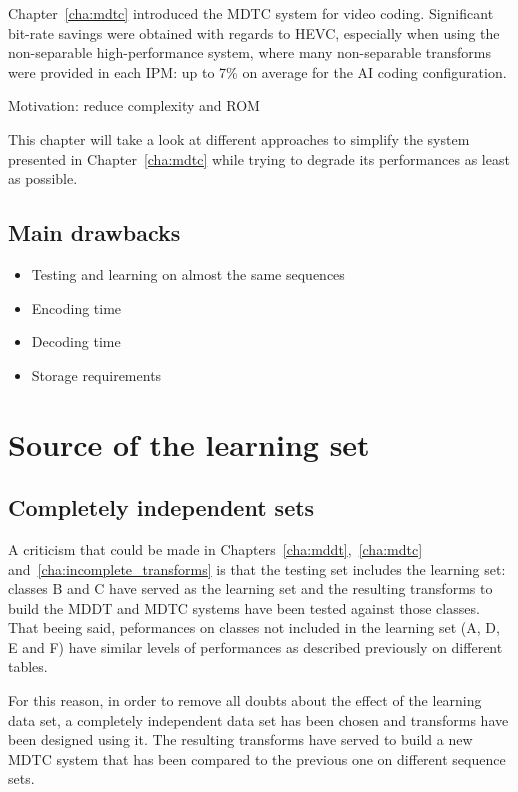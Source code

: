 \documentclass[11pt,a4paper,openright,twoside]{book}
\numberwithin{equation}{section} %
\numberwithin{figure}{section} %
\numberwithin{table}{section} %
\begin{document}
Chapter~\ref{cha:mdtc} introduced the \acf{MDTC} system for video coding.
Significant bit-rate savings were obtained with regards to \ac{HEVC},
especially when using the non-separable high-performance system, where many
non-separable transforms were provided in each \ac{IPM}:
up to 7\% on average for the \ac{AI} coding configuration.

Motivation: reduce complexity and ROM

This chapter will take a look at different approaches to simplify the
system presented in Chapter~\ref{cha:mdtc} while trying to degrade its
performances as least as possible.

\subsection{Main drawbacks}
\label{sub:main_drawbacks}

\begin{itemize}
	\item Testing and learning on almost the same sequences
	\item Encoding time
	\item Decoding time
	\item Storage requirements
\end{itemize}

\section{Source of the learning set}
\label{sec:rw_source_of_the_learning_set}

\subsection{Completely independent sets}
\label{sub:rw_completely_independent_sets}

A criticism that could be made in
Chapters~\ref{cha:mddt},~\ref{cha:mdtc} and~\ref{cha:incomplete_transforms} is
that the testing set includes the learning set:
classes B and C have served as the learning set and the resulting transforms
to build the \ac{MDDT} and \ac{MDTC} systems have been tested against those
classes.
That beeing said, peformances on classes not included in the learning set (A,
D, E and F) have similar levels of performances as described previously on
different tables.

For this reason, in order to remove all doubts about the effect of the
learning data set, a completely independent data set has been chosen and
transforms have been designed using it.
The resulting transforms have served to build a new \ac{MDTC} system that has
been compared to the previous one on different sequence sets.
\end{document}

